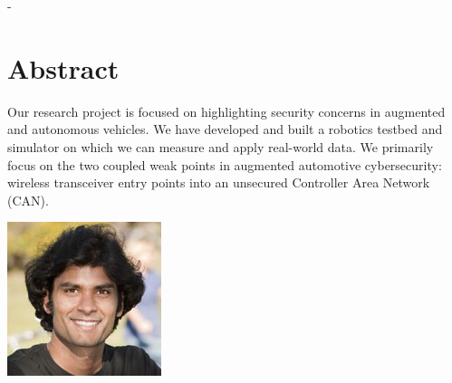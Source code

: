 \documentclass[a0,landscape]{a0poster}
\begin{document}
\vspace{1cm} %


\begin{multicols}{3} %


\color{Navy} %
-
\section*{Abstract}
\large{
Our research project is focused on highlighting security concerns in augmented and autonomous vehicles. We have developed and built a robotics testbed and simulator on which we can measure and apply real-world data. We primarily focus on the two coupled weak points in augmented automotive cybersecurity: wireless transceiver entry points into an unsecured Controller Area Network (CAN).}

\hfill\includegraphics[scale=0.001]{mohit}



\color{DarkSlateGray} %

\end{multicols}
\end{document}
